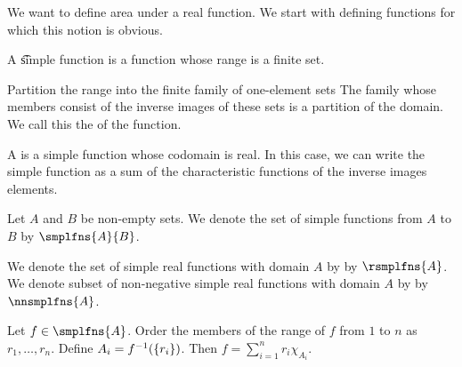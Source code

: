 
\sbasic























\sstart
{}


We want to define area under a real function.
We start with defining functions for which this notion is obvious.


A \t{simple function} is a function whose range is a finite set.

Partition the range into the finite family of
one-element sets
The family whose
members consist of
the inverse images of
these sets is
a partition of
the domain.
We call this the
of the function.

A
is a simple function whose codomain is real.
In this case, we can write the simple
function as a sum of the characteristic
functions of the inverse images elements.


Let $A$ and $B$ be non-empty
sets.
We denote the set of
simple functions
from $A$ to $B$
by $\smplfns{A}{B}$.

We
denote the
set of simple real
functions with domain
$A$ by
by $\rsmplfns{A}$.
We
denote subset of
non-negative simple
real functions
with domain $A$ by
by $\nnsmplfns{A}$.

Let
$f \in \smplfns{A}$.
Order the members
of the range of $f$
from $1$ to $n$ as
$r_1, \dots, r_n$.
Define $A_i = f^{-1}(\{r_i\})$.
Then
$f = \sum_{i = 1}^{n} r_i \chi_{A_i}$.
\strats
